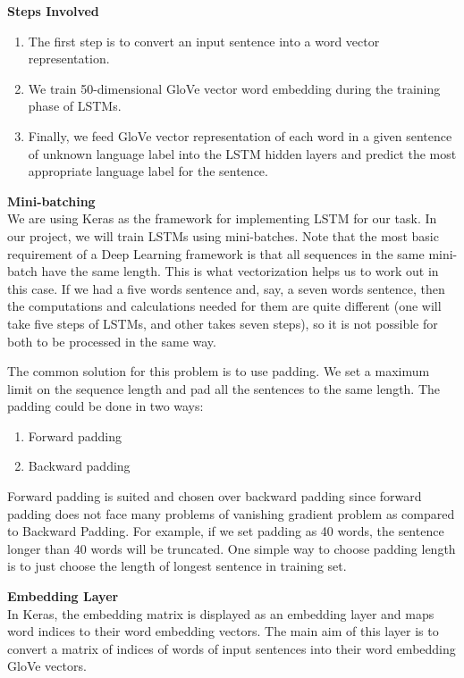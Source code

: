 \documentclass[11pt]{article}
\begin{document}
\noindent \textbf{Steps Involved}
 ~\\
\begin{enumerate}
    \item The first step is to convert an input sentence into a word vector representation.
    \item We train 50-dimensional GloVe vector word embedding during the training phase of LSTMs. 
    \item Finally, we feed GloVe vector representation of each word in a given sentence of unknown language label into the LSTM hidden layers and predict the most appropriate language label for the sentence.
\end{enumerate}

\noindent \textbf{Mini-batching}
 ~\\
We are using Keras as the framework for implementing LSTM for our task. In our project, we will train LSTMs using mini-batches. Note that the most basic requirement of a Deep Learning framework is that all sequences in the same mini-batch have the same length. This is what vectorization helps us to work out in this case. If we had a five words sentence and, say, a seven words sentence, then the computations and calculations needed for them are quite different (one will take five steps of LSTMs, and other takes seven steps), so it is not possible for both to be processed in the same way.

The common solution for this problem is to use padding. We set a maximum limit on the sequence length and pad all the sentences to the same length. The padding could be done in two ways:

\begin{enumerate}
\item Forward padding
\item Backward padding
\end{enumerate}
Forward padding is suited and chosen over backward padding since forward padding does not face many problems of vanishing gradient problem as compared to Backward Padding. For example, if we set padding as 40 words, the sentence longer than 40 words will be truncated. One simple way to choose padding length is to just choose the length of longest sentence in training set.

\noindent \textbf{Embedding Layer}
 ~\\
In Keras, the embedding matrix is displayed as an embedding layer and maps word indices to their word embedding vectors. The main aim of this layer is to convert a matrix of indices of words of input sentences into their word embedding GloVe vectors.
\end{document}
